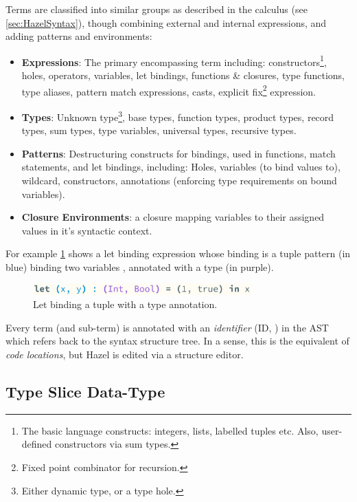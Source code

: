 Terms are classified into similar groups as described in the calculus (see \cref{sec:HazelSyntax}), though combining external and internal expressions, and adding patterns and environments:
\begin{itemize}
\item \textbf{Expressions}: The primary encompassing term including: constructors\footnote{The basic language constructs: integers, lists, labelled tuples etc. Also, user-defined constructors via sum types.}, holes, operators, variables, let bindings, functions \& closures, type functions, type aliases, pattern match expressions, casts, explicit fix\footnote{Fixed point combinator for recursion.} expression.
\item \textbf{Types}: Unknown type\footnote{Either dynamic type, or a type hole.}, base types, function types, product types, record types, sum types, type variables, universal types, recursive types.
\item \textbf{Patterns}: Destructuring constructs for bindings, used in functions, match statements, and let bindings, including: Holes, variables (to bind values to), wildcard, constructors, annotations (enforcing type requirements on bound variables). 
\item \textbf{Closure Environments}: a closure mapping variables to their assigned values in it's syntactic context.
\end{itemize}

For example \cref{fig:tupletermstructure} shows a let binding expression whose binding is a tuple pattern (in blue) binding two variables ,  annotated with a type (in purple).

\begin{figure}[h]
\center\includegraphics[width=0.75\textwidth]{Media/Figures/tuple_term_structure}
\caption{Let binding a tuple with a type annotation.}
\label{fig:tupletermstructure}
\end{figure}

Every term (and sub-term) is annotated with an \textit{identifier} (ID, ) in the AST which refers back to the syntax structure tree. In a sense, this is the equivalent of \textit{code locations}, but Hazel is edited via a structure editor. 
\subsection{Type Slice Data-Type}\label{sec:TypeSliceDataType}

